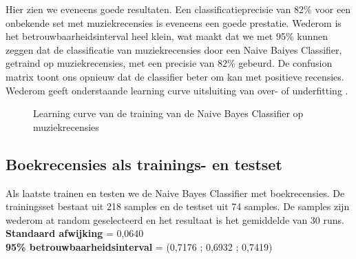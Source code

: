 Hier zien we eveneens goede resultaten. Een classificatieprecisie van 82\% voor een onbekende set met muziekrecensies is eveneens een goede prestatie. Wederom is het betrouwbaarheidsinterval heel klein, wat maakt dat we met 95\% kunnen zeggen dat de classificatie van muziekrecensies door een Naive Baiyes Classifier, getraind op muziekrecensies, met een precisie van 82\% gebeurd. De confusion matrix toont ons opnieuw dat de classifier beter om kan met positieve recensies.
%
Wederom geeft onderstaande learning curve uitsluiting van over- of underfitting .

\begin{figure}[h]%
    \centering
    \label{fig:lc-music-music}
    \caption{Learning curve van de training van de Naive Bayes Classifier op muziekrecensies}
\end{figure}

\subsection{Boekrecensies als trainings- en testset}\label{Boeken als trainings- en testset}

Als laatste trainen en testen we de Naive Bayes Classifier met boekrecensies. De trainingsset bestaat uit 218 samples en de testset uit 74 samples. De samples zijn wederom at random geselecteerd en het resultaat is het gemiddelde van 30 runs.\\

\textbf{Standaard afwijking} = 0,0640\\
\textbf{95\% betrouwbaarheidsinterval} = (0,7176 ; 0,6932 ; 0,7419)\\
 
